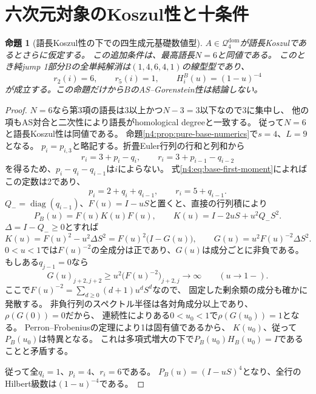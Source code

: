 \documentclass[11pt,a4paper]{ltjsarticle}
\newtheorem{proposition}[theorem]{命題}
\theoremstyle{definition}
\begin{document}
\section{六次元対象のKoszul性と十条件}\label{n4:sec:criteria}

\begin{proposition}[語長Koszul性の下での四生成元基礎数値型]
\label{n4:prop:koszul-base-numerics}
$A\in\mathcal Q_4^{\mathrm{dom}}$が語長Koszulであるとさらに仮定する。
この追加条件は、最高語長$N=6$と同値である。
このとき純jump 1部分$B$の全単純解消は$(1,4,6,4,1)$の線型型であり、
\[
r_2(i)=6,\qquad r_5(i)=1,\qquad
H_i^B(u)=(1-u)^{-4}
\]
が成立する。この命題だけから$B$のAS--Gorenstein性は結論しない。
\end{proposition}
\begin{proof}
$N=6$なら第3項の語長は3以上かつ$N-3=3$以下なので3に集中し、
他の項もAS対合と二次性により語長がhomological degreeと一致する。
従って$N=6$と語長Koszul性は同値である。
命題\ref{n4:prop:pure-base-numerics}で$s=4$、$L=9$となる。
$p_i=p_{i,3}$と略記する。折畳Euler行列の行和と列和から
\[
r_i=3+p_i-q_i,\qquad r_i=3+p_{i-1}-q_{i-2}
\]
を得るため、$p_i-q_i-q_{i-1}$は$i$によらない。
式\eqref{n4:eq:base-first-moment}によればこの定数は2であり、
\[
p_i=2+q_i+q_{i-1},\qquad r_i=5+q_{i-1}.
\]
$Q_- =\operatorname{diag}(q_{i-1})$、$F(u)=I-uS$と置くと、直接の行列積により
\[
P_B(u)=F(u)K(u)F(u),\qquad
K(u)=I-2uS+u^2Q_-S^2.
\]
$\Delta=I-Q_-\ge0$とすれば
\[
K(u)=F(u)^2-u^2\Delta S^2
     =F(u)^2\bigl(I-G(u)\bigr),
\qquad G(u)=u^2F(u)^{-2}\Delta S^2.
\]
$0<u<1$では$F(u)^{-2}$の全成分は正であり、$G(u)$は成分ごとに非負である。
もしある$q_{j-1}=0$なら
\[
G(u)_{j+2,j+2}\ge u^2\bigl(F(u)^{-2}\bigr)_{j+2,j}
\longrightarrow\infty\qquad(u\to1-).
\]
ここで$F(u)^{-2}=\sum_{d\ge0}(d+1)u^dS^d$なので、
固定した剰余類の成分も確かに発散する。
非負行列のスペクトル半径は各対角成分以上であり、$\rho(G(0))=0$だから、
連続性によりある$0<u_0<1$で$\rho(G(u_0))=1$となる。
Perron--Frobeniusの定理により1は固有値であるから、
$K(u_0)$、従って$P_B(u_0)$は特異となる。
これは多項式増大の下で$P_B(u_0)H_B(u_0)=I$であることと矛盾する。

従って全$q_i=1$、$p_i=4$、$r_i=6$である。
$P_B(u)=(I-uS)^4$となり、全行のHilbert級数は$(1-u)^{-4}$である。
\end{proof}
\end{document}
